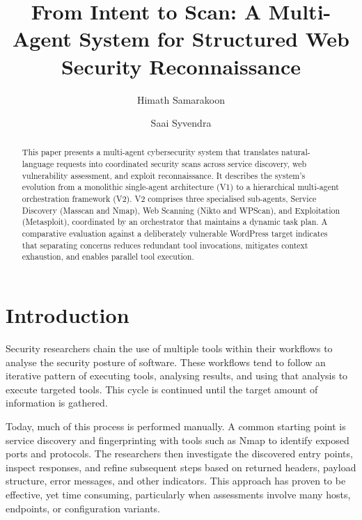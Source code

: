 \documentclass[sigconf,anonymous]{acmart}
\title{From Intent to Scan: A Multi-Agent System for Structured Web Security Reconnaissance}
\author{Himath Samarakoon}
\affiliation{
  \institution{Department of Computer Science}
  \institution{University of Moratuwa}
  \country{Sri Lanka}
}
\author{Saai Syvendra}
\affiliation{
  \institution{Department of Computer Science}
  \institution{University of Moratuwa}
  \country{Sri Lanka}
}
\begin{document}
\begin{abstract}
This paper presents a multi-agent cybersecurity system that translates natural-language requests into coordinated security scans across service discovery, web vulnerability assessment, and exploit reconnaissance. It describes the system's evolution from a monolithic single-agent architecture (V1) to a hierarchical multi-agent orchestration framework (V2). V2 comprises three specialised sub-agents, Service Discovery (Masscan and Nmap), Web Scanning (Nikto and WPScan), and Exploitation (Metasploit), coordinated by an orchestrator that maintains a dynamic task plan. A comparative evaluation against a deliberately vulnerable WordPress target indicates that separating concerns reduces redundant tool invocations, mitigates context exhaustion, and enables parallel tool execution.
\end{abstract}


\maketitle

\section{Introduction}
\label{sec:introduction}

Security researchers chain the use of multiple tools within their
workflows to analyse the security posture of software.
These workflows tend to follow an iterative pattern
of executing tools, analysing results, and using that analysis
to execute targeted tools.
This cycle is continued until the target amount of information is gathered.

Today, much of this process is performed manually.
A common starting point is service discovery and fingerprinting with tools such as Nmap \cite{nmap} to identify exposed ports and protocols.
The researchers then investigate the discovered entry points, inspect responses, and refine subsequent steps based on returned headers, payload structure, error messages, and other indicators.
This approach has proven to be effective, yet time consuming, particularly when assessments involve many hosts, endpoints, or configuration variants.
\end{document}
